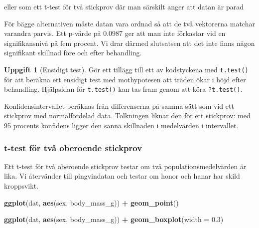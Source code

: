 \documentclass[
]{book}
\newenvironment{Shaded}{\begin{snugshade}}{\end{snugshade}}
\newcommand{\AttributeTok}[1]{\textcolor[rgb]{0.13,0.29,0.53}{#1}}
\newcommand{\FloatTok}[1]{\textcolor[rgb]{0.00,0.00,0.81}{#1}}
\newcommand{\FunctionTok}[1]{\textcolor[rgb]{0.13,0.29,0.53}{\textbf{#1}}}
\newcommand{\NormalTok}[1]{#1}
\newcommand{\SpecialCharTok}[1]{\textcolor[rgb]{0.81,0.36,0.00}{\textbf{#1}}}
\theoremstyle{definition}
\theoremstyle{definition}
\theoremstyle{definition}
\newtheorem{exercise}{Uppgift}[chapter]
\theoremstyle{definition}
\theoremstyle{remark}
\begin{document}
eller som ett t-test för två stickprov där man särskilt anger att datan är parad

\begin{Shaded}
\end{Shaded}

För bägge alternativen måste datan vara ordnad så att de två vektorerna matchar varandra parvis. Ett p-värde på \(0.0987\) ger att man inte förkastar vid en signifikansnivå på fem procent. Vi drar därmed slutsatsen att det inte finns någon signifikant skillnad före och efter behandling.

\begin{exercise}[Ensidigt test]
Gör ett tillägg till ett av kodstyckena med \texttt{t.test()} för att beräkna ett ensidigt test med mothypotesen att träden ökar i höjd efter behandling. Hjälpsidan för \texttt{t.test()} kan tas fram genom att köra \texttt{?t.test()}.
\end{exercise}

Konfidensintervallet beräknas från differenserna på samma sätt som vid ett stickprov med normalfördelad data. Tolkningen liknar den för ett stickprov: med 95 procents konfidens ligger den sanna skillnaden i medelvärden i intervallet.

\subsubsection{t-test för två oberoende stickprov}\label{t-test-fuxf6r-tvuxe5-oberoende-stickprov}

Ett t-test för två oberoende stickprov testar om två populationsmedelvärden är lika. Vi återvänder till pingvindatan och testar om honor och hanar har skild kroppsvikt.

\begin{Shaded}
\begin{Highlighting}[]
\FunctionTok{ggplot}\NormalTok{(dat, }\FunctionTok{aes}\NormalTok{(sex, body\_mass\_g)) }\SpecialCharTok{+}
  \FunctionTok{geom\_point}\NormalTok{()}
\end{Highlighting}
\end{Shaded}

\begin{Shaded}
\begin{Highlighting}[]
\FunctionTok{ggplot}\NormalTok{(dat, }\FunctionTok{aes}\NormalTok{(sex, body\_mass\_g)) }\SpecialCharTok{+}
  \FunctionTok{geom\_boxplot}\NormalTok{(}\AttributeTok{width =} \FloatTok{0.3}\NormalTok{)}
\end{Highlighting}
\end{Shaded}
\end{document}
